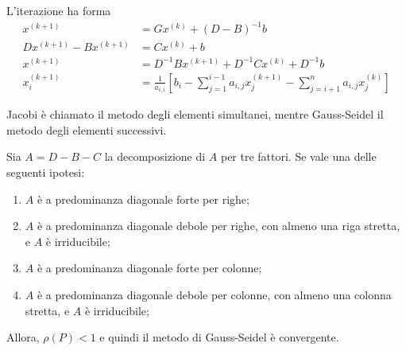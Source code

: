 \documentclass[a4paper]{article}
\begin{document}
L'iterazione ha forma
\begin{align*}
    x^{(k+1)}
    &= Gx^{(k)} + (D-B)^{-1}b \\
    Dx^{(k+1)} - Bx^{(k+1)} &= Cx^{(k)} + b \\
    x^{(k+1)} &= D^{-1}Bx^{(k+1)} + D^{-1}Cx^{(k)} + D^{-1}b \\
    x_i^{(k+1)} &= \frac{1}{a_{i,i}} \left[
        b_i - \sum_{j=1}^{i-1}
        a_{i,j} x_j^{(k+1)} - \sum_{j=i+1}^n a_{i,j}x_j^{(k)}
    \right]
\end{align*}

Jacobi è chiamato il metodo degli elementi simultanei, mentre Gauss-Seidel
il metodo degli elementi successivi.

\begin{snippettheorem}{}
    Sia \(A = D-B-C\) la decomposizione di \(A\) per tre fattori.
    Se vale una delle seguenti ipotesi:
    \begin{enumerate}
        \item \(A\) è a predominanza diagonale forte per righe;
        \item \(A\) è a predominanza diagonale debole per righe, con almeno una riga stretta, e \(A\) è irriducibile;
        \item \(A\) è a predominanza diagonale forte per colonne;
        \item \(A\) è a predominanza diagonale debole per colonne, con almeno una colonna stretta, e \(A\) è irriducibile;
    \end{enumerate}
    Allora, \(\rho(P) < 1\) e quindi il metodo di Gauss-Seidel è convergente.
\end{snippettheorem}
\end{document}
